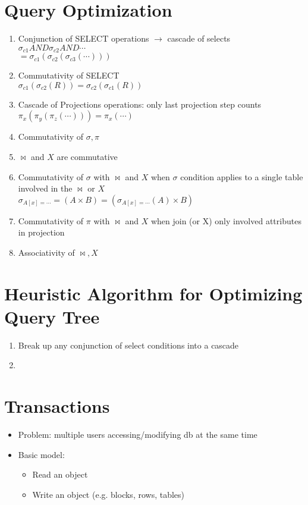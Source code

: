 \documentclass[12pt]{article}
\begin{document}
	\section*{Query Optimization}
		\begin{enumerate}
			\item
				Conjunction of SELECT operations $\rightarrow$ cascade of selects \\
				$\sigma_{c1} AND \sigma_{c2} AND \cdots$ \\
				$=\sigma_{c1}(\sigma_{c2}(\sigma_{c3}(\cdots)))$
			\item
				Commutativity of SELECT \\
				$\sigma_{c1}(\sigma_{c2}(R)) = \sigma_{c2}(\sigma_{c1}(R))$
			\item
				Cascade of Projections operations: only last projection step counts \\
				$\pi_{x}(\pi_{y}(\pi_{z}(\cdots))) = \pi_{x}(\cdots)$
			\item
				Commutativity of $\sigma, \pi$
			\item
				$\bowtie$ and $X$ are commutative
			\item
				Commutativity of $\sigma$ with $\bowtie$ and $X$ when $\sigma$ condition applies to a single table involved in the $\bowtie$ or $X$ \\
				$\sigma_{A[x]=\cdots} = (A \times B) = (\sigma_{A[x]=\cdots}(A) \times B)$
			\item
				Commutativity of $\pi$ with $\bowtie$ and $X$ when join (or X) only involved attributes in projection
			\item
				Associativity of $\bowtie, X$
		\end{enumerate}
	\section*{Heuristic Algorithm for Optimizing Query Tree}
		\begin{enumerate}
			\item
				Break up any conjunction of select conditions into a cascade
			\item

		\end{enumerate}
	\section*{Transactions}
		\begin{itemize}
			\item
				Problem: multiple users accessing/modifying db at the same time
			\item
				Basic model:
				\begin{itemize}
					\item
						Read an object
					\item
						Write an object (e.g. blocks, rows, tables)
				\end{itemize}
		\end{itemize}
\end{document}

